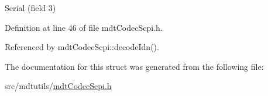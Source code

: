Serial (field 3) 



Definition at line 46 of file mdt\-Codec\-Scpi.\-h.



Referenced by mdt\-Codec\-Scpi\-::decode\-Idn().



The documentation for this struct was generated from the following file\-:\begin{DoxyCompactItemize}
\item 
src/mdtutils/\hyperlink{mdt_codec_scpi_8h}{mdt\-Codec\-Scpi.\-h}\end{DoxyCompactItemize}
